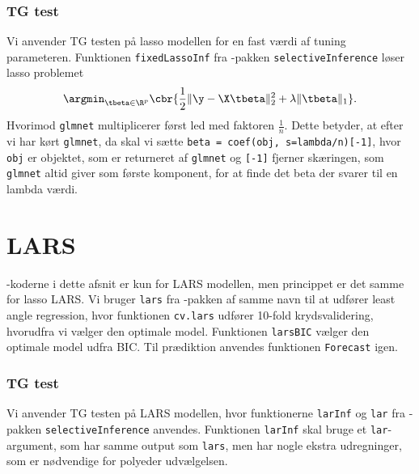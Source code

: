 \subsubsection{TG test} 
Vi anvender TG testen på lasso modellen for en fast værdi af tuning parameteren. 
Funktionen \texttt{fixedLassoInf} fra \Rlang-pakken \texttt{selectiveInference}  løser lasso problemet
\begin{align*}
\argmin_{\tbeta \in \R^p} \cbr{\frac{1}{2} \Vert \y - \X \tbeta \Vert_2^2 + \lambda \Vert \tbeta \Vert_1}.
\end{align*}
Hvorimod \texttt{glmnet} multiplicerer først led med faktoren \(\frac{1}{n}\).
Dette betyder, at efter vi har kørt \texttt{glmnet}, da skal vi sætte \texttt{beta = coef(obj, s=lambda/n)[-1]}, hvor \texttt{obj} er objektet, som er returneret af \texttt{glmnet} og \texttt{[-1]} fjerner skæringen, som \texttt{glmnet} altid giver som første komponent, for at finde det beta der svarer til en lambda værdi.
%
%

\section{LARS} \label{sec:apprkoderlars}
\Rlang-koderne i dette afsnit er kun for LARS modellen, men princippet er det samme for lasso LARS.
Vi bruger \texttt{lars} fra  \Rlang-pakken af samme navn til at udfører least angle regression, hvor funktionen \texttt{cv.lars} udfører 10-fold krydsvalidering, hvorudfra vi vælger den optimale model. 
Funktionen \texttt{larsBIC} vælger den optimale model udfra BIC. 
Til prædiktion anvendes funktionen \texttt{Forecast} igen.

\subsubsection{TG test} \label{subsubsec:inferens}
Vi anvender TG testen på LARS modellen, hvor funktionerne \texttt{larInf} og \texttt{lar} fra \Rlang-pakken \texttt{selectiveInference} anvendes. 
Funktionen \texttt{larInf} skal bruge et \texttt{lar}-argument, som har samme output som \texttt{lars}, men har nogle ekstra udregninger, som er nødvendige for polyeder udvælgelsen. 



